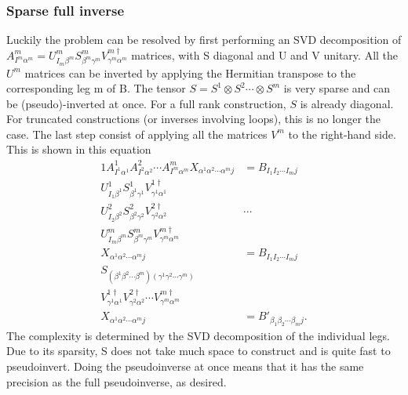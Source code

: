 \subsubsection{Sparse full inverse}

Luckily the problem can be resolved by first performing an SVD decomposition of $A^m_{ I^m \alpha^m } = U^m_{ I_m \beta^m } S^m_{\beta^m \gamma^m}  V^{m\dagger}_{\gamma^m \alpha^m}$ matrices, with S diagonal and U and V unitary. All the $U^m$ matrices can be inverted by applying the Hermitian transpose to the corresponding leg m of B. The tensor $S = S^1 \otimes S^2 \cdots \otimes S^m$ is very sparse and can be (pseudo)-inverted at once. For a full rank construction, $S$  is already diagonal. For truncated constructions (or inverses involving loops), this is no longer the case.
The last step consist of applying all the matrices $V^m$ to the right-hand side. This is shown in this equation
\begin{alignat}{1}
    A^1_{ I^1 \alpha^1 }   A^2_{ I^2 \alpha^2 }  \cdots  A^m_{ I^m \alpha^m }   X_{ \alpha^1  \alpha^2  \cdots \alpha^m j } & =  B_{  I_1  I_2 \cdots I_m   j }               \\%
    U^1_{ I_1 \beta^1 } S^1_{\beta^1 \gamma^1}  V^{1\dagger}_{\gamma^1 \alpha^1}                                            & \nonumber                                       \\
    U^2_{ I_2 \beta^2 } S^2_{\beta^2 \gamma^2}  V^{2\dagger}_{\gamma^2 \alpha^2}                                            & \cdots  \nonumber                               \\
    U^m_{ I_m \beta^m } S^m_{\beta^m \gamma^m}  V^{m\dagger}_{\gamma^m \alpha^m}                                            & \nonumber                                       \\
    X_{ \alpha^1  \alpha^2  \cdots \alpha^m j }                                                                             & =  B_{  I_1  I_2 \cdots I_m   j }               \\ %
    S_{ (\beta^1 \beta^2 \cdots \beta^m) (\gamma^1  \gamma^2 \cdots \gamma^m)  }                                            & \nonumber                                       \\
    V^{1\dagger}_{\gamma^1 \alpha^1}   V^{2\dagger}_{\gamma^2 \alpha^2}  \cdots  V^{m\dagger}_{\gamma^m \alpha^m}           & \nonumber                                       \\
    X_{ \alpha^1  \alpha^2  \cdots \alpha^m j }                                                                             & =  B'_{  \beta_1  \beta_2 \cdots \beta_m   j }.
\end{alignat}
The complexity is determined by the SVD decomposition of the individual legs. Due to its sparsity, S does not take much space to construct and is quite fast to pseudoinvert. Doing the pseudoinverse at once means that it has the same precision as the full pseudoinverse, as desired.

